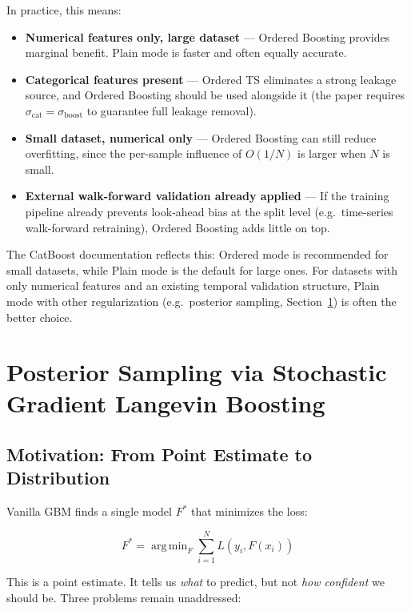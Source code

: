 \documentclass[11pt, a4paper]{article}
\begin{document}
In practice, this means:

\begin{itemize}
  \item \textbf{Numerical features only, large dataset} ---
    Ordered Boosting provides marginal benefit.
    Plain mode is faster and often equally accurate.

  \item \textbf{Categorical features present} ---
    Ordered TS eliminates a strong leakage source, and Ordered Boosting
    should be used alongside it (the paper requires $\sigma_{\mathrm{cat}} = \sigma_{\mathrm{boost}}$
    to guarantee full leakage removal).

  \item \textbf{Small dataset, numerical only} ---
    Ordered Boosting can still reduce overfitting, since the per-sample
    influence of $O(1/N)$ is larger when $N$ is small.

  \item \textbf{External walk-forward validation already applied} ---
    If the training pipeline already prevents look-ahead bias at the split
    level (e.g.\ time-series walk-forward retraining), Ordered Boosting
    adds little on top.
\end{itemize}

The CatBoost documentation reflects this: Ordered mode is recommended
for small datasets, while Plain mode is the default for large ones.
For datasets with only numerical features and an existing temporal validation
structure, Plain mode with other regularization (e.g.\ posterior sampling,
Section~\ref{sec:sglb}) is often the better choice.

\section{Posterior Sampling via Stochastic Gradient Langevin Boosting}
\label{sec:sglb}

\subsection{Motivation: From Point Estimate to Distribution}

Vanilla GBM finds a single model $F^*$ that minimizes the loss:

\[
F^* = \operatorname{arg\,min}_F \sum_{i=1}^N L(y_i, F(x_i))
\]

This is a point estimate. It tells us \emph{what} to predict, but not
\emph{how confident} we should be. Three problems remain unaddressed:
\end{document}
